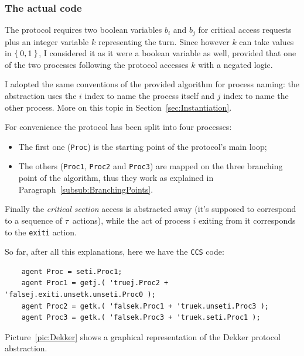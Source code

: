 \documentclass[10pt,a4paper]{article}
\newcommand{\CCS}{{\tt CCS}}
\newcommand{\CCSCode}[1]{{\tt #1}}
\newcommand{\Agent}[1]{{\tt {#1}}}
\begin{document}
        \subsubsection{The actual code}
        \label{subsub:ActualCode}

            The protocol requires two boolean variables $b_i$ and $b_j$
            for critical access requests plus an integer variable $k$
            representing the turn. Since however $k$ can take values in
            $\Set{0, 1}$, I considered it as it were a boolean variable as
            well, provided that one of the two processes following the
            protocol accesses $k$ with a negated logic.

            I adopted the same conventions of the provided algorithm for
            process naming: the abstraction uses the $i$ index to name the
            process itself and $j$ index to name the other process. More
            on this topic in Section~\ref{sec:Instantiation}.

            For convenience the protocol has been split into four
            processes:
            \begin{itemize}
            \item   The first one (\Agent{Proc}) is the starting point of
                    the protocol's main loop;
            \item   The others (\Agent{Proc1}, \Agent{Proc2} and
                    \Agent{Proc3}) are mapped on the three branching point
                    of the algorithm, thus they work as explained in
                    Paragraph~\ref{subsub:BranchingPoints}.
            \end{itemize}

            Finally the \emph{critical section} access is abstracted away
            (it's supposed to correspond to a sequence of $\tau$~actions),
            while the act of process $i$ exiting from it corresponds to
            the \CCSCode{exiti} action.

            So far, after all this explanations, here we have the \CCS{}
            code:
            \begin{verbatim}
    agent Proc = seti.Proc1;
    agent Proc1 = getj.( 'truej.Proc2 + 'falsej.exiti.unsetk.unseti.Proc0 );
    agent Proc2 = getk.( 'falsek.Proc1 + 'truek.unseti.Proc3 );
    agent Proc3 = getk.( 'falsek.Proc3 + 'truek.seti.Proc1 );
            \end{verbatim}

            Picture~\ref{pic:Dekker} shows a graphical representation of the
            Dekker protocol abstraction.
\end{document}
